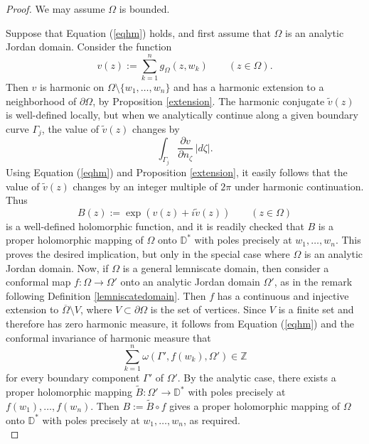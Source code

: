 \documentclass{amsart}
\theoremstyle{plain}
\theoremstyle{definition}
\theoremstyle{remark}
\newcommand{\mZ}{\mathbb{Z}}
\newcommand{\mD}{\mathbb{D}}
\renewcommand {\tilde} {\widetilde}
\begin{document}
\begin{proof}
We may assume $\Omega$ is bounded.

Suppose that Equation (\ref{eqhm}) holds, and first assume that $\Omega$ is an analytic Jordan domain. Consider the function
$$
v(z):=\sum_{k=1}^n g_{\Omega}(z,w_k) \qquad (z \in \Omega).
$$
Then $v$ is harmonic on $\Omega \setminus \{w_1, \dots, w_n\}$ and has a harmonic extension to a neighborhood of $\partial \Omega$, by Proposition \ref{extension}. The harmonic conjugate $\tilde{v}(z)$ is well-defined locally, but when we analytically continue along a given boundary curve $\Gamma_j$, the value of $\tilde{v}(z)$ changes by
$$
\int_{\Gamma_j} \frac{\partial v}{\partial n_\zeta} \, |d\zeta|.
$$
Using Equation (\ref{eqhm}) and Proposition \ref{extension}, it easily follows that the value of $\tilde{v}(z)$ changes by an integer multiple of $2\pi$ under harmonic continuation. Thus
$$
B(z):=\exp{\left(v(z) + i \tilde{v}(z)\right)} \qquad (z \in \Omega)
$$
is a well-defined holomorphic function, and it is readily checked that $B$ is a proper holomorphic mapping of $\Omega$ onto $\mD^*$ with poles precisely at $w_1, \dots, w_n$. This proves the desired implication, but only in the special case where $\Omega$ is an analytic Jordan domain. Now, if $\Omega$ is a general lemniscate domain, then consider a conformal map $f:\Omega \to \Omega'$ onto an analytic Jordan domain $\Omega'$, as in the remark following Definition \ref{lemniscatedomain}. Then $f$ has a continuous and injective extension to $\overline{\Omega} \setminus V$, where $V \subset \partial \Omega$ is the set of vertices. Since $V$ is a finite set and therefore has zero harmonic measure, it follows from Equation (\ref{eqhm}) and the conformal invariance of harmonic measure that
$$
\sum_{k=1}^n \omega(\Gamma', f(w_k), \Omega') \in \mZ
$$
for every boundary component $\Gamma'$ of $\Omega'$. By the analytic case, there exists a proper holomorphic mapping $\tilde{B}:\Omega' \to \mD^*$ with poles precisely at $f(w_1), \dots, f(w_n)$. Then $B:=\tilde{B} \circ f$ gives a proper holomorphic mapping of $\Omega$ onto $\mD^*$ with poles precisely at $w_1, \dots, w_n$, as required.
\\


\end{proof}
\end{document}
